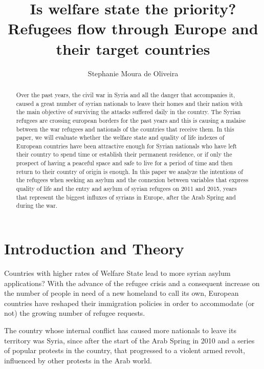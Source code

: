 \documentclass[]{elsarticle} %
\begin{document}
\begin{frontmatter}

  \title{Is welfare state the priority? Refugees flow through Europe and their
target countries}
    \author[Universidade Federal de Pernambuco - UFPE]{Stephanie Moura de Oliveira}
      \address[Universidade Federal de Pernambuco - UFPE]{Universidade Federal de Pernambuco}
  
  \begin{abstract}
  Over the past years, the civil war in Syria and all the danger that
  accompanies it, caused a great number of syrian nationals to leave their
  homes and their nation with the main objective of surviving the attacks
  suffered daily in the country. The Syrian refugees are crossing european
  borders for the past years and this is causing a malaise between the war
  refugees and nationals of the countries that receive them. In this
  paper, we will evaluate whether the welfare state and quality of life
  indexes of European countries have been attractive enough for Syrian
  nationals who have left their country to spend time or establish their
  permanent residence, or if only the prospect of having a peaceful space
  and safe to live for a period of time and then return to their country
  of origin is enough. In this paper we analyze the intentions of the
  refugees when seeking an asylum and the connexion between variables that
  express quality of life and the entry and asylum of syrian refugees on
  2011 and 2015, years that represent the biggest influxes of syrians in
  Europe, after the Arab Spring and during the war.
  \end{abstract}
  
 \end{frontmatter}

\section{Introduction and Theory}\label{introduction-and-theory}

Countries with higher rates of Welfare State lead to more syrian asylum
applications? With the advance of the refugee crisis and a consequent
increase on the number of people in need of a new homeland to call its
own, European countries have reshaped their immigration policies in
order to accommodate (or not) the growing number of refugee requests.

The country whose internal conflict has caused more nationals to leave
its territory was Syria, since after the start of the Arab Spring in
2010 and a series of popular protests in the country, that progressed to
a violent armed revolt, influenced by other protests in the Arab world.
\end{document}
